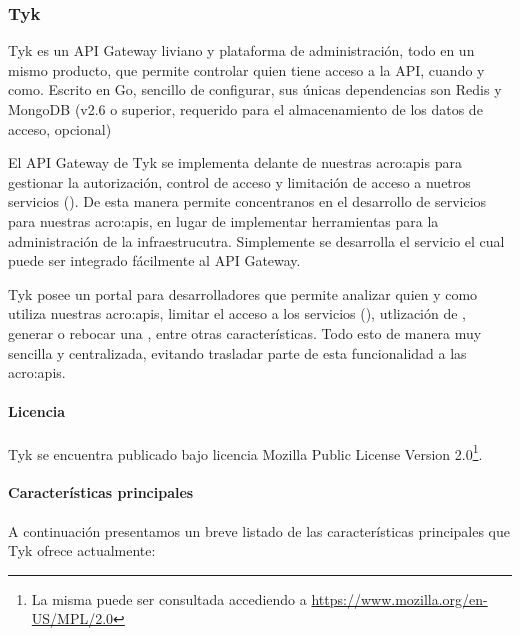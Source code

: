 \subsubsection{Tyk}
\label{soa:tecnologias:tyk}

Tyk es un API Gateway liviano y plataforma de administración, todo en un mismo producto, que permite controlar quien tiene acceso a la API, cuando y como.  Escrito en Go, sencillo de configurar, sus únicas dependencias son Redis y MongoDB (v2.6 o superior, requerido para el almacenamiento de los datos de acceso, opcional)

El API Gateway de Tyk se implementa delante de nuestras \glspl{acro:api} para gestionar la autorización, control de acceso y limitación de acceso a nuetros servicios ().  De esta manera permite concentranos en el desarrollo de servicios para nuestras \glspl{acro:api}, en lugar de implementar herramientas para la administración de la infraestrucutra.  Simplemente se desarrolla el servicio el cual puede ser integrado fácilmente al API Gateway.

Tyk posee un portal para desarrolladores que permite analizar quien y como utiliza nuestras \glspl{acro:api}, limitar el acceso a los servicios (), utlización de , generar o rebocar una , entre otras características.  Todo esto de manera muy sencilla y centralizada, evitando trasladar parte de esta funcionalidad a las \glspl{acro:api}.

\paragraph{Licencia}

Tyk se encuentra publicado bajo licencia Mozilla Public License Version 2.0\footnote{La misma puede ser consultada accediendo a \url{https://www.mozilla.org/en-US/MPL/2.0}}.

\paragraph{Características principales}

A continuación presentamos un breve listado de las características principales que Tyk ofrece actualmente:

